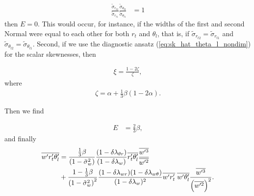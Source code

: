 \begin{align*}
    \frac{\tilde{\sigma}_{r_{t2}}}{\tilde{\sigma}_{r_{t1}}} \frac{\tilde{\sigma}_{\theta_{l2}}}{\tilde{\sigma}_{\theta_{l1}}}
    &= 1
\end{align*}
then $E=0$.
This would occur, for instance, if the widths of the first and second Normal were equal to each other for both $r_t$ and $\theta_l$, that is, if $\tilde{\sigma}_{r_{t2}} = \tilde{\sigma}_{r_{t1}}$ and $\tilde{\sigma}_{\theta_{l2}} = \tilde{\sigma}_{\theta_{l1}}$.
Second, if we use the diagnostic ansatz (\cref{eq:sk_hat_theta_l_nondim}) for the scalar skewnesses, then

\begin{align}
    \label{eq:xi}
    \xi = \frac{1 - 2 \zeta}{\zeta},
\end{align}
where
\begin{align}
    \label{eq:zeta}
    \zeta = \alpha + \frac{1}{3} \beta \left(1 - 2 \alpha \right).
\end{align}

Then we find

\begin{align}
    \label{eq:E_eq_23beta}
    E &= \frac{2}{3} \beta,
\end{align}
and finally
\begin{align}
    \label{eq:wpqtpthlp_beta}
    \overline{w' r_t' \theta_l'}
    &= \frac{\frac{1}{3}\beta}{\left( 1 - \tilde{\sigma}_w^2 \right)} \frac{(1-\delta \lambda_{\theta r})}{(1 - \delta \lambda_w)} \overline{r_t' \theta_l'} \frac{\overline{w'^3}}{\overline{w'^2}} \nonumber\\
    &+ \frac{1 - \frac{1}{3}\beta}{\left( 1 - \tilde{\sigma}_w^2 \right)^2} \frac{(1-\delta \lambda_{w r})(1-\delta \lambda_{w \theta})} {(1 - \delta \lambda_w)^2} \overline{w' r_t'} \; \overline{w' \theta_l'} \frac{\overline{w'^3}}{\left( \overline{w'^2} \right)^2}.
\end{align}